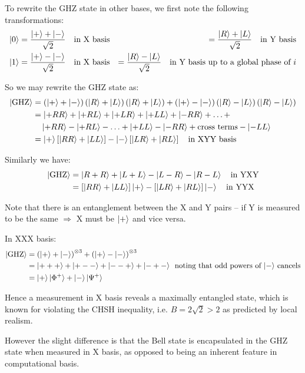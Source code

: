 \begin{parts}
	To rewrite the GHZ state in other bases, we first note the following transformations:
	\begin{align*}
		\ket{0} &= \frac{\ket{+} + \ket{-}}{\sqrt{2}} \textnormal{\hspace{1em}in X basis} &= \frac{\ket{R} + \ket{L}}{\sqrt{2}} \textnormal{\hspace{1em}in Y basis} \\
		\ket{1} &= \frac{\ket{+} - \ket{-}}{\sqrt{2}} \textnormal{\hspace{1em}in X basis} &= \frac{\ket{R} - \ket{L}}{\sqrt{2}} \textnormal{\hspace{1em}in Y basis up to a global phase of $i$}
	\end{align*}
	
	So we may rewrite the GHZ state as:
	\begin{align*}
		\ket{\textnormal{GHZ}} &= \left(\ket{+} + \ket{-}\right) \left(\ket{R} + \ket{L}\right) \left(\ket{R} + \ket{L}\right) + \left(\ket{+} - \ket{-}\right) \left(\ket{R} - \ket{L}\right) \left(\ket{R} - \ket{L}\right) \\
		&= \ket{+RR} + \ket{+RL} + \ket{+LR} + \ket{+LL} + \ket{-RR} + \ldots + \\
		&\quad \ket{+RR} - \ket{+RL} - \ldots + \ket{+LL} - \ket{-RR} + \textnormal{cross terms} - \ket{-LL} \\
		&= \ket{+}\left[\ket{RR} + \ket{LL}\right] - \ket{-}\left[\ket{LR} + \ket{RL}\right] \textnormal{\hspace{1em}in XYY basis}
	\end{align*}
	
	Similarly we have:
	\begin{align*}
		\ket{\textnormal{GHZ}} &= \ket{R+R} + \ket{L+L} - \ket{L-R} - \ket{R-L} \textnormal{\hspace{1em}in YXY} \\
		&= \left[\ket{RR} + \ket{LL}\right]\ket{+} - \left[\ket{LR} + \ket{RL}\right]\ket{-} \textnormal{\hspace{1em}in YYX}
	\end{align*}
	
	Note that there is an entanglement between the X and Y pairs -- if Y is measured to be the same $\Rightarrow$ X must be $\ket{+}$ and vice versa.
	
	In XXX basis:
	\begin{align*}
		\ket{\textnormal{GHZ}} &= \left(\ket{+} + \ket{-}\right)^{\otimes 3} + \left(\ket{+} - \ket{-}\right)^{\otimes 3} \\
		&= \ket{+++} + \ket{+--} + \ket{--+} + \ket{-+-} \textnormal{\hspace{.5em}noting that odd powers of $\ket{-}$ cancels} \\
		&= \ket{+}\ket{\Phi^+} + \ket{-}\ket{\Psi^+}
	\end{align*}
	
	Hence a measurement in X basis reveals a maximally entangled state, which is known for violating the CHSH inequality, i.e. $B = 2\sqrt{2} > 2$ as predicted by local realism.
	
	However the slight difference is that the Bell state is encapsulated in the GHZ state when measured in X basis, as opposed to being an inherent feature in computational basis.
\end{parts}